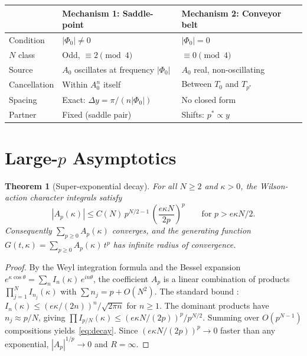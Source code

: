 \documentclass[12pt]{article}
\newtheorem{theorem}{Theorem}
\theoremstyle{definition}
\theoremstyle{remark}
\begin{document}
\medskip
\begin{center}
\begin{tabular}{lll}
\toprule
& \textbf{Mechanism 1: Saddle-point} & \textbf{Mechanism 2: Conveyor belt} \\
\midrule
Condition & $|\Phi_0| \neq 0$ & $|\Phi_0| = 0$ \\
$N$ class & Odd, $\equiv 2\!\pmod{4}$ & $\equiv 0\!\pmod{4}$ \\
Source & $A_0$ oscillates at frequency $|\Phi_0|$ & $A_0$ real, non-oscillating \\
Cancellation & Within $A_0^n$ itself & Between $T_0$ and $T_{p^*}$ \\
Spacing & Exact: $\Delta y = \pi/(n|\Phi_0|)$ & No closed form \\
Partner & Fixed (saddle pair) & Shifts: $p^* \propto y$ \\
\bottomrule
\end{tabular}
\end{center}


\section{Large-$p$ Asymptotics}\label{sec:asymptotics}

\begin{theorem}[Super-exponential decay]\label{thm:decay}
For all $N \geq 2$ and $\kappa > 0$, the Wilson-action character
integrals satisfy
\begin{equation}\label{eq:decay}
  |A_p(\kappa)| \leq C(N)\, p^{N/2 - 1}\,
  \left(\frac{e\kappa N}{2p}\right)^p \qquad \text{for } p > e\kappa N/2.
\end{equation}
Consequently $\sum_{p \geq 0} A_p(\kappa)$ converges, and the generating
function $G(t,\kappa) = \sum_{p \geq 0} A_p(\kappa)\, t^p$ has infinite
radius of convergence.
\end{theorem}

\begin{proof}
By the Weyl integration formula and the Bessel expansion
$e^{\kappa\cos\theta} = \sum_n I_n(\kappa)\, e^{in\theta}$, the
coefficient $A_p$ is a linear combination of products
$\prod_{j=1}^N I_{n_j}(\kappa)$ with $\sum n_j = p + O(N^2)$.
The standard bound \cite{Watson1944}:
$I_n(\kappa) \leq (e\kappa/(2n))^n / \sqrt{2\pi n}$ for $n \geq 1$.
The dominant products have $n_j \approx p/N$, giving
$\prod I_{p/N}(\kappa) \leq (e\kappa N/(2p))^p / p^{N/2}$.
Summing over $O(p^{N-1})$ compositions yields~\eqref{eq:decay}.
Since $(e\kappa N/(2p))^p \to 0$ faster than any exponential,
$|A_p|^{1/p} \to 0$ and $R = \infty$.
\end{proof}
\end{document}
